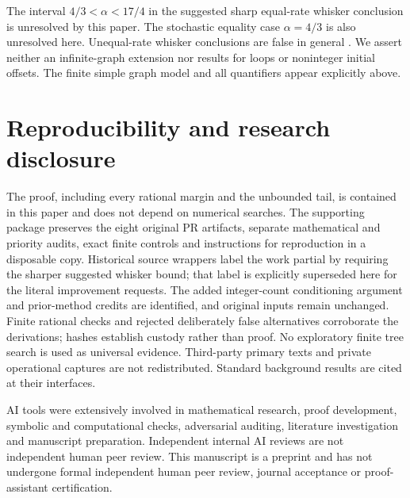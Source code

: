 \documentclass[11pt]{article}
\begin{document}
The interval $4/3<\alpha<17/4$ in the suggested sharp equal-rate
whisker conclusion is unresolved by this paper. The stochastic equality
case $\alpha=4/3$ is also unresolved here. Unequal-rate whisker conclusions
are false in general \cite[Example~1]{HK}. We assert neither an infinite-graph
extension nor results for loops or noninteger initial offsets.
The finite simple graph model and all quantifiers appear explicitly above.

\section{Reproducibility and research disclosure}
The proof, including every rational margin and the unbounded tail, is
contained in this paper and does not depend on numerical searches.
The supporting package preserves the eight original PR artifacts,
separate mathematical and priority audits, exact finite controls and
instructions for reproduction in a disposable copy. Historical source
wrappers label the work partial by requiring the sharper suggested
whisker bound; that label is explicitly superseded here for the literal
improvement requests. The added integer-count conditioning argument and
prior-method credits are identified, and original inputs remain unchanged.
Finite rational checks and rejected deliberately false alternatives
corroborate the derivations; hashes establish custody rather than proof.
No exploratory finite tree search is used as universal evidence.
Third-party primary texts and private operational captures are not
redistributed. Standard background results are cited at their interfaces.

AI tools were extensively involved in mathematical research, proof
development, symbolic and computational checks, adversarial auditing,
literature investigation and manuscript preparation. Independent internal
AI reviews are not independent human peer review. This manuscript is a
preprint and has not undergone formal independent human peer review,
journal acceptance or proof-assistant certification.
\end{document}

